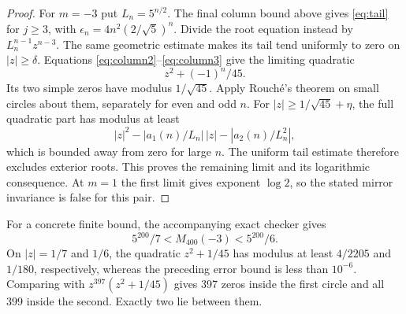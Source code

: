 \begin{proof}
For $m=-3$ put $L_n=5^{n/2}$. The final column bound above gives
\eqref{eq:tail} for $j\geq3$, with
$\epsilon_n=4n^2(2/\sqrt5)^n$.
Divide the root equation instead by $L_n^{n-1}z^{n-3}$.
The same geometric estimate makes its tail tend uniformly to zero
on $|z|\geq\delta$. Equations \eqref{eq:column2}--\eqref{eq:column3}
give the limiting quadratic
\[
 z^2+(-1)^n/45.
\]
Its two simple zeros have modulus $1/\sqrt{45}$. Apply Rouch\'e's
theorem on small circles about them, separately for even and odd
$n$. For $|z|\geq1/\sqrt{45}+\eta$, the full quadratic part
has modulus at least
\[
 |z|^2-|a_1(n)/L_n|\,|z|-|a_2(n)/L_n^2|,
\]
which is bounded away from zero for large $n$.
The uniform tail estimate therefore excludes exterior roots.
This proves the remaining limit and its logarithmic consequence.
At $m=1$ the first limit gives exponent $\log2$, so the stated
mirror invariance is false for this pair.
\end{proof}

For a concrete finite bound, the accompanying exact checker gives
\[
 5^{200}/7<M_{400}(-3)<5^{200}/6.
\]
On $|z|=1/7$ and $1/6$, the quadratic $z^2+1/45$ has modulus
at least $4/2205$ and $1/180$, respectively, whereas the preceding
error bound is less than $10^{-6}$. Comparing with
$z^{397}(z^2+1/45)$ gives 397 zeros inside the first circle and
all 399 inside the second. Exactly two lie between them.

